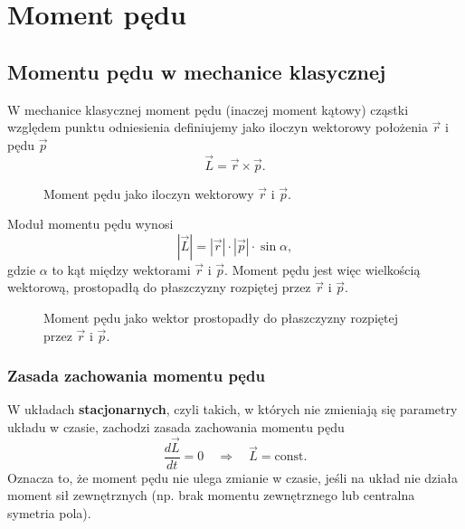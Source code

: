 \section{Moment pędu}

\subsection{Momentu pędu w mechanice klasycznej}
W mechanice klasycznej moment pędu (inaczej moment kątowy) cząstki względem punktu odniesienia definiujemy jako iloczyn wektorowy położenia $\vec{r}$ i pędu $\vec{p}$
$$
\vec{L} = \vec{r} \times \vec{p}.
$$
\begin{figure}[H]
\centering
{}
\caption{Moment pędu jako iloczyn wektorowy $\vec{r}$ i $\vec{p}$.}
\end{figure}

Moduł momentu pędu wynosi
$$
|\vec{L}| = |\vec{r}| \cdot |\vec{p}| \cdot \sin \alpha,
$$
gdzie $\alpha$ to kąt między wektorami $\vec{r}$ i $\vec{p}$. Moment pędu jest więc wielkością wektorową, prostopadłą do płaszczyzny rozpiętej przez $\vec{r}$ i $\vec{p}$.
\begin{figure}[H]
\centering
{}
\caption{Moment pędu jako wektor prostopadły do płaszczyzny rozpiętej przez $\vec{r}$ i $\vec{p}$.}
\end{figure}

\subsubsection*{Zasada zachowania momentu pędu}
W układach \textbf{stacjonarnych}, czyli takich, w których nie zmieniają się parametry układu w czasie, zachodzi zasada zachowania momentu pędu
$$
\frac{d\vec{L}}{dt} = 0 \quad \Rightarrow \quad \vec{L} = \text{const.}
$$
Oznacza to, że moment pędu nie ulega zmianie w czasie, jeśli na układ nie działa moment sił zewnętrznych (np. brak momentu zewnętrznego lub centralna symetria pola).

